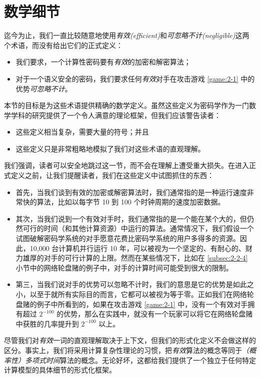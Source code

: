 \section{数学细节}\label{sec:2-3}

迄今为止，我们一直比较随意地使用\emph{有效(efficient)}和\emph{可忽略不计(negligible)}这两个术语，而没有给出它们的正式定义：
\begin{itemize}
	\item 我们要求，一个计算性密码要有\emph{有效}的加密和解密算法；
	\item 对于一个语义安全的密码，我们要求任何\emph{有效}对手在攻击游戏 \ref{game:2-1} 中的优势\emph{可忽略不计}。
\end{itemize}
本节的目标是为这些术语提供精确的数学定义。虽然这些定义为密码学作为一门数学学科的研究提供了一个令人满意的理论框架，但我们应该警告读者：
\begin{itemize}
	\item 这些定义相当复杂，需要大量的符号；并且
	\item 这些定义只是非常粗略地模拟了我们对这些术语的直观理解。
\end{itemize}
我们强调，读者可以安全地跳过这一节，而不会在理解上遭受重大损失。在进入正式定义之前，让我们提醒读者，我们在这些定义中试图抓住的东西：
\begin{itemize}
	\item 首先，当我们谈到有效的加密或解密算法时，我们通常指的是一种运行速度非常快的算法，比如以每字节 10 到 100 个时钟周期的速度加密数据。
	\item 其次，当我们说到一个有效对手时，我们通常指的是一个能在某个大的，但仍然可行的时间（和其他计算资源）中运行的算法。通常情况下，我们假设一个试图破解密码学系统的对手愿意花费比密码学系统的用户多得多的资源。因此，10,000 台计算机并行运行 10 年，可以被视为一个坚定的、有耐心的、财力雄厚的对手的可行计算的上限。然而在某些情况下，比如在 \ref{subsec:2-2-4} 小节中的网络轮盘赌的例子中，对手的计算时间可能受到很大的限制。
	\item 第三，当我们说对手的优势可以忽略不计时，我们的意思是它的优势是如此之小，以至于就所有实际目的而言，它都可以被视为等于零。正如我们在网络轮盘赌的例子中所看到的，如果在攻击游戏 \ref{game:2-1} 中，没有一个有效对手拥有超过 $2^{-100}$ 的优势，那么在实践中，就没有一个玩家可以将它在网络轮盘赌中获胜的几率提升到 $2^{-100}$ 以上。
\end{itemize}

尽管我们对\emph{有效}一词的直观理解取决于上下文，但我们的形式化定义不会做这样的区分。事实上，我们将采用计算复杂性理论的习惯，把\emph{有效}算法的概念等同于\emph{（概率性）多项式时间}算法的概念。无论好坏，这都给我们提供了一个独立于任何特定计算模型的具体细节的形式化框架。

